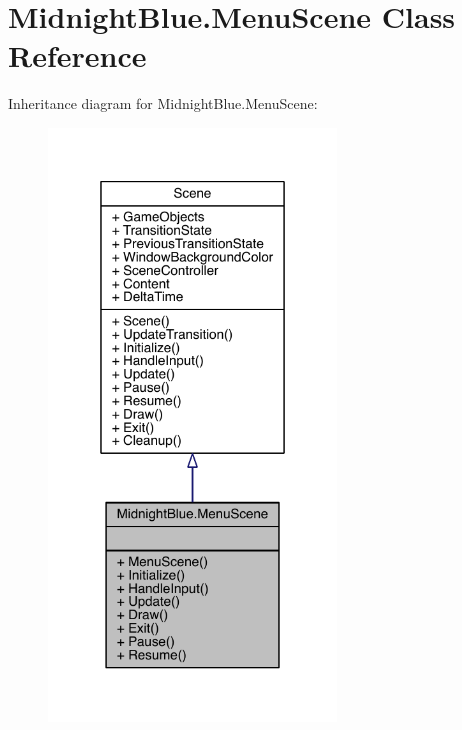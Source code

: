 \hypertarget{class_midnight_blue_1_1_menu_scene}{}\section{Midnight\+Blue.\+Menu\+Scene Class Reference}
\label{class_midnight_blue_1_1_menu_scene}


Inheritance diagram for Midnight\+Blue.\+Menu\+Scene\+:\nopagebreak
\begin{figure}[H]
\begin{center}
\leavevmode
\includegraphics[width=217pt]{class_midnight_blue_1_1_menu_scene__inherit__graph}
\end{center}
\end{figure}


